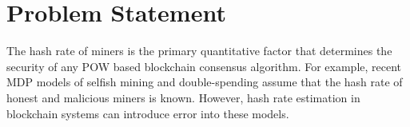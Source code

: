 
\section{Problem Statement}
The hash rate of miners is the primary quantitative factor that determines the security of any POW based blockchain consensus algorithm. For example, recent MDP models of selfish mining and double-spending assume that the hash rate of honest and malicious miners is known. However, hash rate estimation in blockchain systems can introduce error into these models. 

